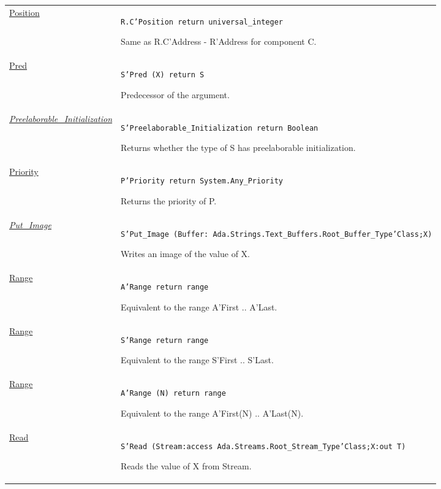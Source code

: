 \documentclass[english]{article}
\begin{document}
\begin{scriptsize}
\begin{multicols*}{3}
\begin{tabular}{@{}p{2cm}p{6.5cm}}
   \href{http://www.ada-auth.org/standards/22rm/html/RM-K-2.html}{Position} & \texttt{R.C'Position return universal\_integer}

   Same as R.C'Address - R'Address for component C.\\

   \href{http://www.ada-auth.org/standards/22rm/html/RM-K-2.html}{Pred} & \texttt{S'Pred (X) return S}

   Predecessor of the argument.\\

   \href{http://www.ada-auth.org/standards/22rm/html/RM-K-2.html}{\textit{Preelaborable\_Initialization}} & \texttt{S'Preelaborable\_Initialization return Boolean}

   Returns whether the type of S has preelaborable initialization.\\

   \href{http://www.ada-auth.org/standards/22rm/html/RM-K-2.html}{Priority} & \texttt{P'Priority return System.Any\_Priority}

   Returns the priority of P.\\

   \href{http://www.ada-auth.org/standards/22rm/html/RM-K-2.html}{\textit{Put\_Image}} & \texttt{S'Put\_Image (Buffer:
   Ada.Strings.Text\_Buffers.Root\_Buffer\_Type'Class;X)}

   Writes an image of the value of X.\\

   \href{http://www.ada-auth.org/standards/22rm/html/RM-K-2.html}{Range} & \texttt{A'Range return range}

   Equivalent to the range A'First .. A'Last.\\

   \href{http://www.ada-auth.org/standards/22rm/html/RM-K-2.html}{Range} & \texttt{S'Range return range}

   Equivalent to the range S'First .. S'Last.\\

   \href{http://www.ada-auth.org/standards/22rm/html/RM-K-2.html}{Range} & \texttt{A'Range (N) return range}

   Equivalent to the range A'First(N) .. A'Last(N).\\

   \href{http://www.ada-auth.org/standards/22rm/html/RM-K-2.html}{Read} & \texttt{S'Read (Stream:access Ada.Streams.Root\_Stream\_Type'Class;X:out T)}

   Reads the value of X from Stream.\\


\end{tabular}
\end{multicols*}
\end{scriptsize}
\end{document}
